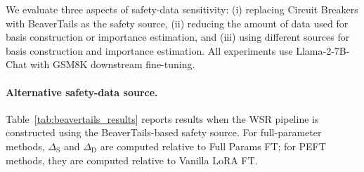 \documentclass{article}
\begin{document}
We evaluate three aspects of safety-data sensitivity: (i) replacing Circuit Breakers with BeaverTails as the safety source, (ii) reducing the amount of data used for basis construction or importance estimation, and (iii) using different sources for basis construction and importance estimation. All experiments use Llama-2-7B-Chat with GSM8K downstream fine-tuning.

\paragraph{Alternative safety-data source.}
Table~\ref{tab:beavertails_results} reports results when the WSR pipeline is constructed using the BeaverTails-based safety source. For full-parameter methods, $\Delta_{\mathrm{S}}$ and $\Delta_{\mathrm{D}}$ are computed relative to Full Params FT; for PEFT methods, they are computed relative to Vanilla LoRA FT.
\end{document}
